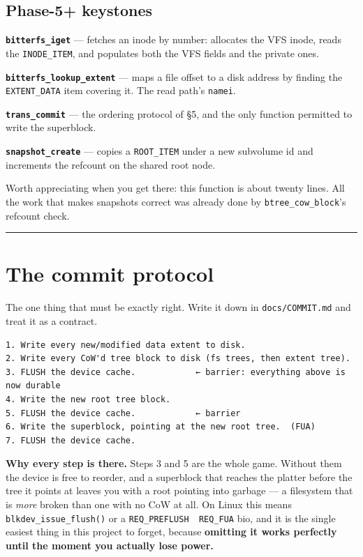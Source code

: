 \hypertarget{phase-5-keystones}{%
\subsection{Phase-5+ keystones}\label{phase-5-keystones}}

\textbf{\texttt{bitterfs\_iget}} --- fetches an inode by number: allocates the VFS inode, reads the
\texttt{INODE\_ITEM}, and populates both the VFS fields and the private ones.

\textbf{\texttt{bitterfs\_lookup\_extent}} --- maps a file offset to a disk address by finding the
\texttt{EXTENT\_DATA} item covering it. The read path's \texttt{namei}.

\textbf{\texttt{trans\_commit}} --- the ordering protocol of §5, and the only function permitted to write
the superblock.

\textbf{\texttt{snapshot\_create}} --- copies a \texttt{ROOT\_ITEM} under a new subvolume id and increments the
refcount on the shared root node.

Worth appreciating when you get there: this function is about twenty lines. All the work
that makes snapshots correct was already done by \texttt{btree\_cow\_block}'s refcount check.

\begin{center}\rule{0.5\linewidth}{0.5pt}\end{center}

\hypertarget{the-commit-protocol}{%
\section{The commit protocol}\label{the-commit-protocol}}

The one thing that must be exactly right. Write it down in \texttt{docs/COMMIT.md} and treat it
as a contract.

\begin{verbatim}
1. Write every new/modified data extent to disk.
2. Write every CoW'd tree block to disk (fs trees, then extent tree).
3. FLUSH the device cache.            ← barrier: everything above is now durable
4. Write the new root tree block.
5. FLUSH the device cache.            ← barrier
6. Write the superblock, pointing at the new root tree.  (FUA)
7. FLUSH the device cache.
\end{verbatim}

\textbf{Why every step is there.} Steps 3 and 5 are the whole game. Without them the device is
free to reorder, and a superblock that reaches the platter before the tree it points at
leaves you with a root pointing into garbage --- a filesystem that is \emph{more} broken than one
with no CoW at all. On Linux this means \texttt{blkdev\_issue\_flush()} or a \texttt{REQ\_PREFLUSH\ \textbar{}\ REQ\_FUA} bio, and it is the single easiest thing in this project to forget, because
\textbf{omitting it works perfectly until the moment you actually lose power.}


